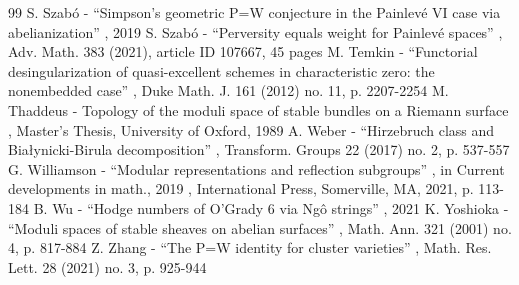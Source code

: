 \documentclass[11pt]{article}
\theoremstyle{definition}
\begin{document}
\begin{thebibliography}{99}
 S. Szabó - “Simpson’s geometric P=W conjecture in the Painlevé VI case via abelianization” , 2019
 S. Szabó - “Perversity equals weight for Painlevé spaces” , Adv. Math. 383 (2021), article ID 107667, 45 pages
 M. Temkin - “Functorial desingularization of quasi-excellent schemes in characteristic zero: the nonembedded case” , Duke Math. J. 161 (2012) no. 11, p. 2207-2254
 M. Thaddeus - Topology of the moduli space of stable bundles on a Riemann surface , Master’s Thesis, University of Oxford, 1989
 A. Weber - “Hirzebruch class and Białynicki-Birula decomposition” , Transform. Groups 22 (2017) no. 2, p. 537-557
 G. Williamson - “Modular representations and reflection subgroups” , in Current developments in math., 2019 , International Press, Somerville, MA, 2021, p. 113-184
 B. Wu - “Hodge numbers of O’Grady 6 via Ngô strings” , 2021
 K. Yoshioka - “Moduli spaces of stable sheaves on abelian surfaces” , Math. Ann. 321 (2001) no. 4, p. 817-884
 Z. Zhang - “The P=W identity for cluster varieties” , Math. Res. Lett. 28 (2021) no. 3, p. 925-944
\end{thebibliography}
\end{document}
